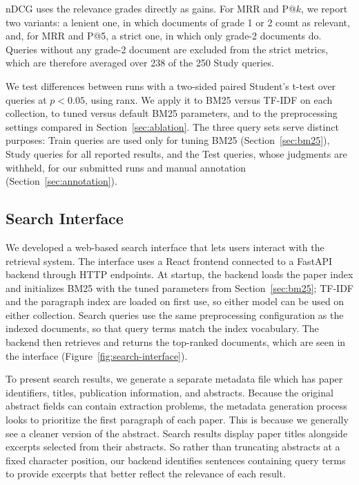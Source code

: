 \documentclass[sigconf,nonacm]{acmart}
\begin{document}
nDCG uses the relevance grades directly as gains. For MRR and P@$k$, we
report two variants: a lenient one, in which documents of grade 1 or 2
count as relevant, and, for MRR and P@5, a strict one, in which only
grade-2 documents do. Queries without any grade-2 document are excluded
from the strict metrics, which are therefore averaged over 238 of the 250
Study queries.


We test differences between runs with a two-sided paired Student's
t-test over queries at $p < 0.05$, using ranx. We apply it to BM25
versus TF-IDF on each collection, to tuned versus default BM25
parameters, and to the preprocessing settings compared in
Section~\ref{sec:ablation}. The three query sets serve distinct
purposes: Train queries are used only for tuning BM25
(Section~\ref{sec:bm25}), Study queries for all reported results, and
the Test queries, whose judgments are withheld, for our submitted runs
and manual annotation (Section~\ref{sec:annotation}).


\subsection{Search Interface}
\label{sec:interface}
We developed a web-based search interface that lets users interact with the retrieval system. 
The interface uses a React frontend connected to a FastAPI backend through HTTP endpoints. 
At startup, the backend loads the paper index and initializes BM25 with the tuned parameters 
from Section~\ref{sec:bm25}; TF-IDF and the paragraph index are loaded on first use, so either 
model can be used on either collection.
Search queries use the same preprocessing configuration as the indexed documents, so that 
query terms match the index vocabulary.
The backend then retrieves and returns the top-ranked documents, which are seen in the interface 
(Figure~\ref{fig:search-interface}). 

To present search results, we generate a separate metadata file which has paper identifiers, 
titles, publication information, and abstracts. Because the original abstract fields can contain extraction problems, 
the metadata generation process looks to prioritize the first paragraph of each paper. This is because we generally 
see a cleaner version of the abstract. Search results display paper titles alongside excerpts selected from their abstracts. 
So rather than truncating abstracts at a fixed character position, our backend identifies sentences containing query terms 
to provide excerpts that better reflect the relevance of each result. 
\end{document}

